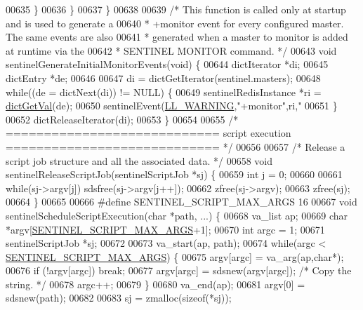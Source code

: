 \begin{DoxyCode}
{{{{{{{{{00635         \}
00636     \}
00637 \}
00638 
00639 \textcolor{comment}{/* This function is called only at startup and is used to generate a}
00640 \textcolor{comment}{ * +monitor event for every configured master. The same events are also}
00641 \textcolor{comment}{ * generated when a master to monitor is added at runtime via the}
00642 \textcolor{comment}{ * SENTINEL MONITOR command. */}
00643 \textcolor{keywordtype}{void} sentinelGenerateInitialMonitorEvents(\textcolor{keywordtype}{void}) \{
00644     dictIterator *di;
00645     dictEntry *de;
00646 
00647     di = dictGetIterator(sentinel.masters);
00648     \textcolor{keywordflow}{while}((de = dictNext(di)) != NULL) \{
00649         sentinelRedisInstance *ri = \hyperlink{dict_8h_ae8d2cc391873b2bea2b87c4f80f43120}{dictGetVal}(de);
00650         sentinelEvent(\hyperlink{server_8h_a31229b9334bba7d6be2a72970967a14b}{LL\_WARNING},\textcolor{stringliteral}{"+monitor"},ri,\textcolor{stringliteral}{"%
00651     \}
00652     dictReleaseIterator(di);
00653 \}
00654 
00655 \textcolor{comment}{/* ============================ script execution ============================ */}
00656 
00657 \textcolor{comment}{/* Release a script job structure and all the associated data. */}
00658 \textcolor{keywordtype}{void} sentinelReleaseScriptJob(sentinelScriptJob *sj) \{
00659     \textcolor{keywordtype}{int} j = 0;
00660 
00661     \textcolor{keywordflow}{while}(sj->argv[j]) sdsfree(sj->argv[j++]);
00662     zfree(sj->argv);
00663     zfree(sj);
00664 \}
00665 
00666 \textcolor{preprocessor}{#}\textcolor{preprocessor}{define} \textcolor{preprocessor}{SENTINEL\_SCRIPT\_MAX\_ARGS} 16
00667 \textcolor{keywordtype}{void} sentinelScheduleScriptExecution(\textcolor{keywordtype}{char} *path, ...) \{
00668     va\_list ap;
00669     \textcolor{keywordtype}{char} *argv[\hyperlink{sentinel_8c_a9587f7bc164287b356887d67849bf658}{SENTINEL\_SCRIPT\_MAX\_ARGS}+1];
00670     \textcolor{keywordtype}{int} argc = 1;
00671     sentinelScriptJob *sj;
00672 
00673     va\_start(ap, path);
00674     \textcolor{keywordflow}{while}(argc < \hyperlink{sentinel_8c_a9587f7bc164287b356887d67849bf658}{SENTINEL\_SCRIPT\_MAX\_ARGS}) \{
00675         argv[argc] = va\_arg(ap,\textcolor{keywordtype}{char}*);
00676         \textcolor{keywordflow}{if} (!argv[argc]) \textcolor{keywordflow}{break};
00677         argv[argc] = sdsnew(argv[argc]); \textcolor{comment}{/* Copy the string. */}
00678         argc++;
00679     \}
00680     va\_end(ap);
00681     argv[0] = sdsnew(path);
00682 
00683     sj = zmalloc(\textcolor{keyword}{sizeof}(*sj));
}}}}}}}}}}
\end{DoxyCode}
